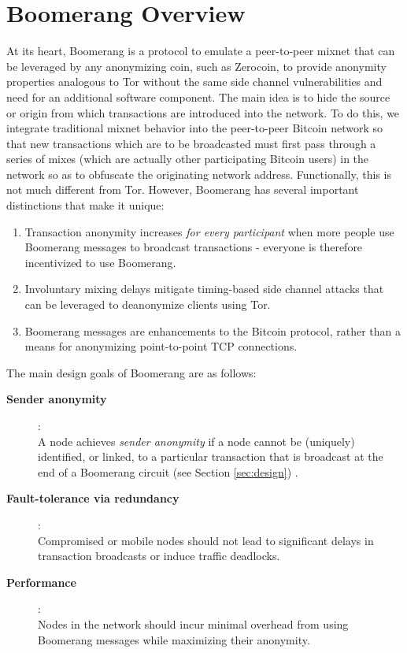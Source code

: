 \section{Boomerang Overview}
At its heart, Boomerang is a protocol to emulate a peer-to-peer mixnet that can be leveraged by any anonymizing coin, such as Zerocoin, to provide anonymity properties analogous to Tor without the same side channel vulnerabilities and need for an additional software component. The main idea is to hide the source or origin from which transactions are introduced into the network. To do this, we integrate traditional mixnet behavior into the peer-to-peer Bitcoin network so that new transactions which are to be broadcasted must first pass through a series of mixes (which are actually other participating Bitcoin users) in the network so as to obfuscate the originating network address. Functionally, this is not much different from Tor. However, Boomerang has several important distinctions that make it unique:
\begin{enumerate}
	\item Transaction anonymity increases \emph{for every participant} when more people use Boomerang messages to broadcast transactions - everyone is therefore incentivized to use Boomerang. 
	\item Involuntary mixing delays mitigate timing-based side channel attacks that can be leveraged to deanonymize clients using Tor. 
	\item Boomerang messages are enhancements to the Bitcoin protocol, rather than a means for anonymizing point-to-point TCP connections. 
\end{enumerate}

The main design goals of Boomerang are as follows:
\begin{description}
	\item[{\bf Sender anonymity}]: \\A node achieves \emph{sender anonymity} if a node cannot be (uniquely) identified, or linked, to a particular transaction that is broadcast at the end of a Boomerang circuit (see Section \ref{sec:design}) \cite{AnonymityTerms}. 
	\item[{\bf Fault-tolerance via redundancy}]: \\Compromised or mobile nodes should not lead to significant delays in transaction broadcasts or induce traffic deadlocks.
	\item[{\bf Performance}]: \\Nodes in the network should incur minimal overhead from using Boomerang messages while maximizing their anonymity.
\end{description}

